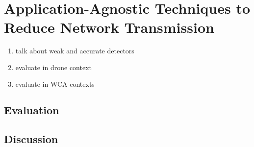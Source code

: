 \chapter{Application-Agnostic Techniques to Reduce Network Transmission}

\begin{enumerate}
    \item talk about weak and accurate detectors
    \item evaluate in drone context
    \item evaluate in WCA contexts
\end{enumerate}



\section{Evaluation}
\section{Discussion}
